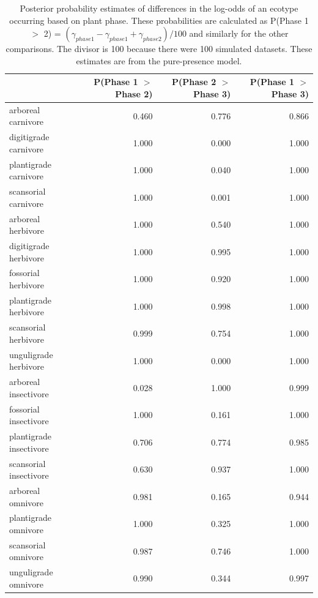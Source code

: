 \documentclass[12pt,letterpaper]{article}
\begin{document}
\begin{table}[ht]
  \centering
  \caption[Posterior probablity estimates of differences in occurrence by plant phase]{Posterior probability estimates of differences in the log-odds of an ecotype occurring based on plant phase. These probabilities are calculated as P(Phase 1 \(>\) 2) = \( (\gamma_{phase 1} - \gamma_{phase 1} + \gamma_{phase 2}) / 100\) and similarly for the other comparisons. The divisor is 100 because there were 100 simulated datasets. These estimates are from the pure-presence model.}
  \label{tab:occur_plant}
  \begin{tabular}{ l r r r }
    \hline
    & P(Phase 1 $>$ Phase 2) & P(Phase 2 $>$ Phase 3) & P(Phase 1 $>$ Phase 3) \\ 
    \hline
    arboreal carnivore & 0.460 & 0.776 & 0.866 \\ 
    digitigrade carnivore & 1.000 & 0.000 & 1.000 \\ 
    plantigrade carnivore & 1.000 & 0.040 & 1.000 \\ 
    scansorial carnivore & 1.000 & 0.001 & 1.000 \\ 
    arboreal herbivore & 1.000 & 0.540 & 1.000 \\ 
    digitigrade herbivore & 1.000 & 0.995 & 1.000 \\ 
    fossorial herbivore & 1.000 & 0.920 & 1.000 \\ 
    plantigrade herbivore & 1.000 & 0.998 & 1.000 \\ 
    scansorial herbivore & 0.999 & 0.754 & 1.000 \\ 
    unguligrade herbivore & 1.000 & 0.000 & 1.000 \\ 
    arboreal insectivore & 0.028 & 1.000 & 0.999 \\ 
    fossorial insectivore & 1.000 & 0.161 & 1.000 \\ 
    plantigrade insectivore & 0.706 & 0.774 & 0.985 \\ 
    scansorial insectivore & 0.630 & 0.937 & 1.000 \\ 
    arboreal omnivore & 0.981 & 0.165 & 0.944 \\ 
    plantigrade omnivore & 1.000 & 0.325 & 1.000 \\ 
    scansorial omnivore & 0.987 & 0.746 & 1.000 \\ 
    unguligrade omnivore & 0.990 & 0.344 & 0.997 \\ 
    \hline
  \end{tabular}
\end{table}
\end{document}
